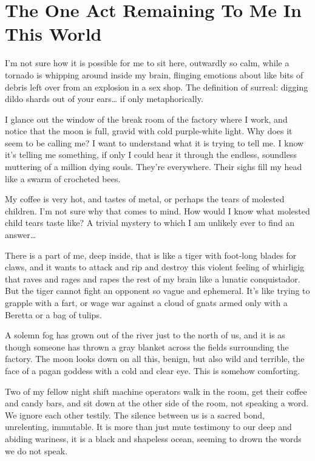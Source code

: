 \chapter[The One Act Remaining]{The One Act Remaining To Me In This World}





I'm not sure how it is possible for me to sit here, outwardly
so calm, while a tornado is whipping around inside my brain,
flinging emotions about like bits of debris left over from an
explosion in a sex shop. The definition of surreal: digging dildo
shards out of your ears{\ldots} if only metaphorically.



I glance out the window of the break room of the factory where I
work, and notice that the moon is full, gravid with cold
purple-white light. Why does it seem to be calling me? I want to
understand what it is trying to tell me. I know it's telling
me something, if only I could hear it through the endless,
soundless muttering of a million dying souls. They're everywhere.
Their sighs fill my head like a swarm of crocheted bees.



My coffee is very hot, and tastes of metal, or perhaps the tears of
molested children. I'm not sure why that comes to mind. How
would I know what molested child tears taste like? A trivial
mystery to which I am unlikely ever to find an answer{\ldots}



There is a part of me, deep inside, that is like a tiger with
foot-long blades for claws, and it wants to attack and rip and
destroy this violent feeling of whirligig that raves and rages and
rapes the rest of my brain like a lunatic conquistador. But the
tiger cannot fight an opponent so vague and ephemeral. It's
like trying to grapple with a fart, or wage war against a cloud of
gnats armed only with a Beretta or a bag of tulips.



A solemn fog has grown out of the river just to the north of us,
and it is as though someone has thrown a gray blanket across the
fields surrounding the factory. The moon looks down on all this,
benign, but also wild and terrible, the face of a pagan goddess
with a cold and clear eye. This is somehow comforting.



Two of my fellow night shift machine operators walk in the room,
get their coffee and candy bars, and sit down at the other side of
the room, not speaking a word. We ignore each other testily. The
silence between us is a sacred bond, unrelenting, immutable. It is
more than just mute testimony to our deep and abiding wariness, it
is a black and shapeless ocean, seeming to drown the words we do
not speak.



